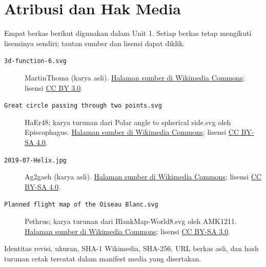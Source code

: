\chapter*{Atribusi dan Hak Media}
Empat berkas berikut digunakan dalam Unit 1. Setiap berkas tetap mengikuti lisensinya sendiri; tautan sumber dan lisensi dapat diklik.
\begin{description}
\item[\texttt{3d-function-6.svg}] MartinThoma (karya asli).
\href{https://commons.wikimedia.org/wiki/File:3d-function-6.svg}{Halaman sumber di Wikimedia Commons}; lisensi \href{https://creativecommons.org/licenses/by/3.0}{CC BY 3.0}.
\item[\texttt{Great circle passing through two points.svg}] HaEr48; karya turunan dari Polar angle to spherical side.svg oleh Episcophagus.
\href{https://commons.wikimedia.org/wiki/File:Great_circle_passing_through_two_points.svg}{Halaman sumber di Wikimedia Commons}; lisensi \href{https://creativecommons.org/licenses/by-sa/4.0}{CC BY-SA 4.0}.
\item[\texttt{2019-07-Helix.jpg}] Ag2gaeh (karya asli).
\href{https://commons.wikimedia.org/wiki/File:2019-07-Helix.jpg}{Halaman sumber di Wikimedia Commons}; lisensi \href{https://creativecommons.org/licenses/by-sa/4.0}{CC BY-SA 4.0}.
\item[\texttt{Planned flight map of the Oiseau Blanc.svg}] Pethrus; karya turunan dari BlankMap-World8.svg oleh AMK1211.
\href{https://commons.wikimedia.org/wiki/File:Planned_flight_map_of_the_Oiseau_Blanc.svg}{Halaman sumber di Wikimedia Commons}; lisensi \href{https://creativecommons.org/licenses/by-sa/3.0}{CC BY-SA 3.0}.
\end{description}
Identitas revisi, ukuran, SHA-1 Wikimedia, SHA-256, URL berkas asli, dan hash turunan cetak tercatat dalam manifest media yang disertakan.
